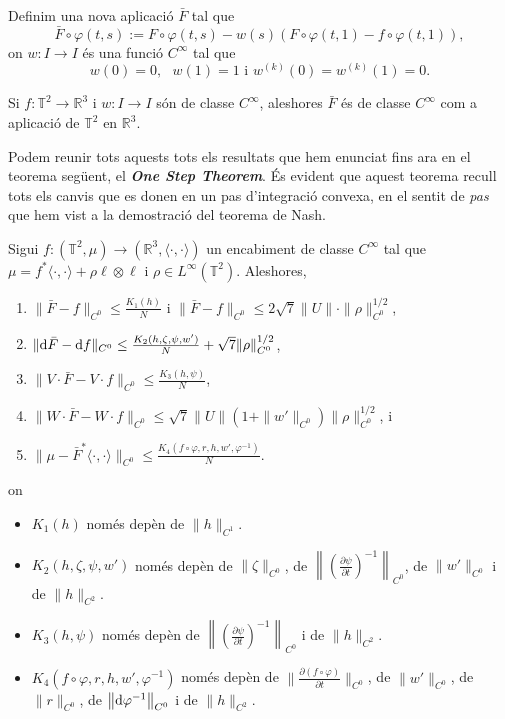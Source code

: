 Definim una nova aplicació $\bar F$ tal que
\begin{equation}
    \label{eq:def_barF}
    \bar F\circ\varphi(t,s) := F\circ\varphi(t,s) - w(s)(F\circ\varphi(t,1)-f\circ\varphi(t,1)),
\end{equation}
on $w:I\to I$ és una funció $C^\infty$ tal que 
\begin{equation*}
    w(0)=0, \text{ } w(1)=1 \text{ i } w^{(k)}(0)=w^{(k)}(1)=0.
\end{equation*}
\begin{lema}
    \label{lema:lema8}
    Si $f:\mathbb T^2\to\mathbb R^3$ i $w:I\to I$ són de classe $C^\infty$, aleshores $\bar F$ és de classe $C^\infty$ com a aplicació de $\mathbb T^2$ en $\mathbb R^3$.
\end{lema}
Podem reunir tots aquests tots els resultats que hem enunciat fins ara en el teorema següent, el \textbf{\textit{One Step Theorem}}. És evident que aquest teorema recull tots els canvis que es donen en un pas d'integració convexa, en el sentit de \textit{pas} que hem vist a la demostració del teorema de Nash.
\begin{teo}\label{teo:OneStep}
    Sigui $f:(\mathbb T^2, \mu)\to(\mathbb R^3, \langle\cdot, \cdot\rangle)$ un encabiment de classe $C^\infty$ tal que $\mu = f^*\langle\cdot, \cdot\rangle + \rho\ell\otimes\ell$ i $\rho\in L^\infty(\mathbb T^2)$. Aleshores, 
    \begin{enumerate}
        \item $\|\bar F-f\|_{C^0}\le\frac{K_1(h)}{N}$ i $\|\bar F-f\|_{C^0}\le 2\sqrt7\|U\|\cdot\|\rho\|^{1/2}_{C^0}$,
        \item $\|\text d\bar F-\text df\|_{C^0}\le\frac{K_2(h,\zeta,\psi,w')}{N} + \sqrt7\|\rho\|^{1/2}_{C^0}$,
        \item $\|V\cdot\bar F-V\cdot f\|_{C^0}\le\frac{K_3(h,\psi)}{N}$,
        \item $\|W\cdot\bar F-W\cdot f\|_{C^0}\le\sqrt7\|U\|(1+\|w'\|_{C^0})\|\rho\|^{1/2}_{C^0}$, i
        \item $\|\mu - \bar F^*\langle\cdot, \cdot\rangle\|_{C^0}\le\frac{K_4(f\circ\varphi,r,h,w',\varphi^{-1})}{N}$.
    \end{enumerate}
    on 
    \begin{itemize}
        \item $K_1(h)$ només depèn de $\|h\|_{C^1}$.
        \item $K_2(h,\zeta,\psi,w')$ només depèn de $\|\zeta\|_{C^0}$, de $\left\|\left(  \frac{\partial\psi}{\partial t}\right)^{-1}\right\|_{C^0}$, de $\|w'\|_{C^0}$ i de $\|h\|_{C^2}$.
        \item $K_3(h,\psi)$ només depèn de $\left\|\left(  \frac{\partial\psi}{\partial t}\right)^{-1}\right\|_{C^0}$ i de $\|h\|_{C^2}$.
        \item $K_4(f\circ\varphi,r,h,w',\varphi^{-1})$ només depèn de $\|\frac{\partial(f\circ\varphi)}{\partial t}\|_{C^0}$, de $\|w'\|_{C^0}$, de $\|r\|_{C^0}$, de $\left\|\text d\varphi^{-1}\right\|_{C^0}$ i de $\|h\|_{C^2}$.
    \end{itemize}
\end{teo}
